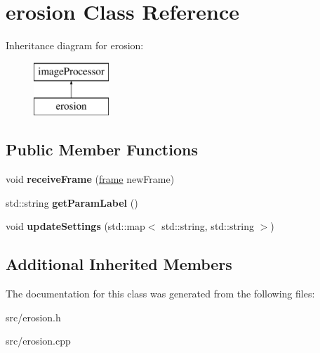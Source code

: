 \hypertarget{classerosion}{}\section{erosion Class Reference}
\label{classerosion}
Inheritance diagram for erosion\+:\begin{figure}[H]
\begin{center}
\leavevmode
\includegraphics[height=2.000000cm]{classerosion}
\end{center}
\end{figure}
\subsection*{Public Member Functions}
\begin{DoxyCompactItemize}
\item 
void {\bfseries receive\+Frame} (\hyperlink{classframe}{frame} new\+Frame)\hypertarget{classerosion_a40662b6f2b9567d3640bc9d9e6cbd712}{}\label{classerosion_a40662b6f2b9567d3640bc9d9e6cbd712}

\item 
std\+::string {\bfseries get\+Param\+Label} ()\hypertarget{classerosion_a3fa83e64a15e8f6eefede9d3831c3d41}{}\label{classerosion_a3fa83e64a15e8f6eefede9d3831c3d41}

\item 
void {\bfseries update\+Settings} (std\+::map$<$ std\+::string, std\+::string $>$)\hypertarget{classerosion_acb938db0c6a7393a8291baba748e8c50}{}\label{classerosion_acb938db0c6a7393a8291baba748e8c50}

\end{DoxyCompactItemize}
\subsection*{Additional Inherited Members}


The documentation for this class was generated from the following files\+:\begin{DoxyCompactItemize}
\item 
src/erosion.\+h\item 
src/erosion.\+cpp\end{DoxyCompactItemize}
